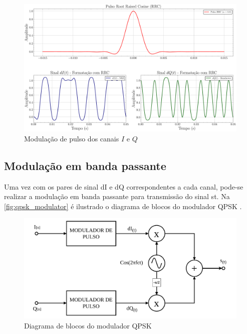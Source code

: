 \begin{figure}[H]
	\caption{Modulação de pulso dos canais $I$ e $Q$}\label{fig:pulse_modulate}
	\includegraphics[width=\linewidth]{assets/cap2/pulse_modulate.pdf}
\end{figure}



\subsection{Modulação em banda passante} 

Uma vez com os pares de sinal \gls{dI} e \gls{dQ} correspondentes a cada canal, pode-se realizar a modulação em banda passante para transmissão do sinal \gls{st}. Na \autoref{fig:qpsk_modulator} é ilustrado o diagrama de blocos do modulador \gls{QPSK} \cite{cnes_services_and_message_formats_ed2_rev2_2006}.

\begin{figure}[H]
	\centering
	\caption{Diagrama de blocos do modulador QPSK}\label{fig:qpsk_modulator}
	\includegraphics[width=\linewidth]{assets/cap2/qpsk_modulator.pdf}
\end{figure}

